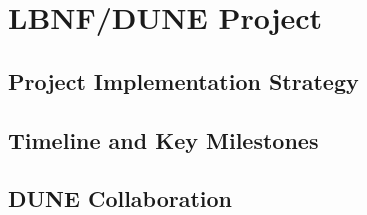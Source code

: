 \chapter{LBNF/DUNE Project}
\label{ch:exec-summ-project}


\section{Project Implementation Strategy}
\label{sec:exec-summ-proj- impl-strat}



\section{Timeline and Key Milestones}
\label{sec:exec-summ-proj-time}



\section{DUNE Collaboration}
\label{sec:exec-summ-proj-collab}


